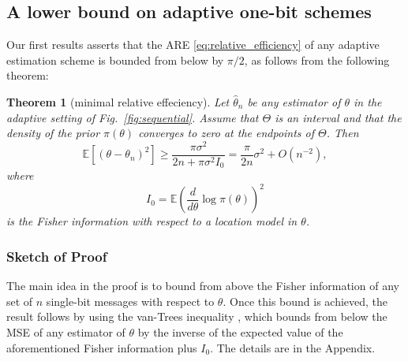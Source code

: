 \documentclass[letterpaper, conference]{IEEEtran}      %
\newtheorem{thm}{\bf{Theorem}}
\begin{document}

\subsection{A lower bound on adaptive one-bit schemes}
Our first results asserts that the ARE \eqref{eq:relative_efficiency} of any adaptive estimation scheme is bounded from below by $\pi/2$, as follows from the following theorem:
\begin{thm}[minimal relative effeciency] \label{thm:adpative_lower_bound}
Let $\widehat{\theta}_n$ be any estimator of $\theta$ in the adaptive setting of Fig.~\ref{fig:sequential}. Assume that $\Theta$ is an interval and that the density of the prior $\pi(\theta)$ converges to zero at the endpoints of $\Theta$. Then
\[
\mathbb E\left[ (\theta-\theta_n)^2 \right] \geq  \frac{\pi \sigma^2 }{2n +\pi \sigma^2  I_0}  =  \frac{\pi}{2n}\sigma^2+O(n^{-2}),
\]
where 
\[
I_0 = \mathbb E \left( \frac{d}{d\theta} \log \pi (\theta) \right)^2
\]
is the Fisher information with respect to a location model in $\theta$. 
\end{thm}

\subsubsection*{Sketch of Proof}
The main idea in the proof is to bound from above the Fisher information of any set of $n$ single-bit messages with respect to $\theta$. Once this bound is achieved, the result follows by using the van-Trees inequality \cite[Thm. 2.13]{tsybakov2008introduction},\cite{gill1995applications} which bounds from below the MSE of any estimator of $\theta$ by the inverse of the expected value of the aforementioned Fisher information plus $I_0$. The details are in the Appendix.\\
\end{document}
